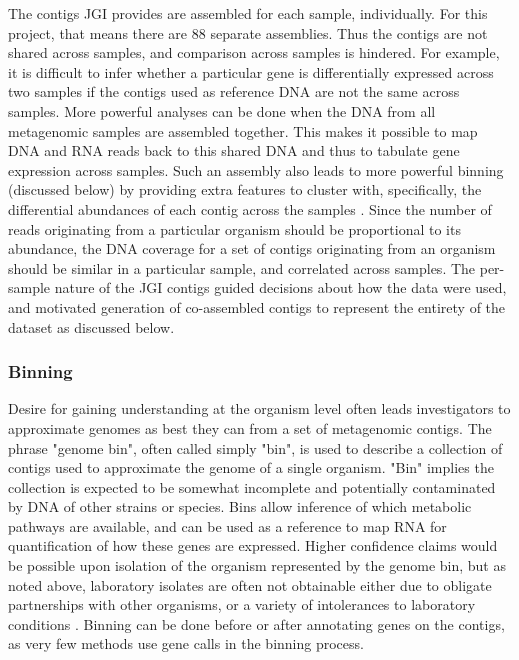 The contigs JGI provides are assembled for each sample, individually.
For this project, that means there are 88 separate assemblies.
Thus the contigs are not shared across samples, and comparison across samples is hindered.
For example, it is difficult to infer whether a particular gene is differentially expressed across two samples if the contigs used as reference DNA are not the same across samples.
More powerful analyses can be done when the DNA from all metagenomic samples are assembled together.
This makes it possible to map DNA and RNA reads back to this shared DNA and thus to tabulate gene expression across samples.
Such an assembly also leads to more powerful binning (discussed below) by providing extra features to cluster with, specifically, the differential abundances of each contig across the samples \cite{albertsen2013}.
Since the number of reads originating from a particular organism should be proportional to its abundance, the DNA coverage for a set of contigs originating from an organism should be similar in a particular sample, and correlated across samples.
The per-sample nature of the JGI contigs guided decisions about how the data were used, and motivated generation of co-assembled contigs to represent the entirety of the dataset as discussed below.

\subsubsection{Binning}   %
Desire for gaining understanding at the organism level often leads investigators to approximate genomes as best they can from a set of metagenomic contigs.
The phrase "genome bin", often called simply "bin", is used to describe a collection of contigs used to approximate the genome of a single organism.
"Bin" implies the collection is expected to be somewhat incomplete and potentially contaminated by DNA of other strains or species.
Bins allow inference of which metabolic pathways are available, and can be used as a reference to map RNA for quantification of how these genes are expressed.
Higher confidence claims would be possible upon isolation of the organism represented by the genome bin, but as noted above, laboratory isolates are often not obtainable either due to obligate partnerships with other organisms, or a variety of intolerances to laboratory conditions \cite{stewart2012}.
Binning can be done before or after annotating genes on the contigs, as very few methods use gene calls in the binning process.

